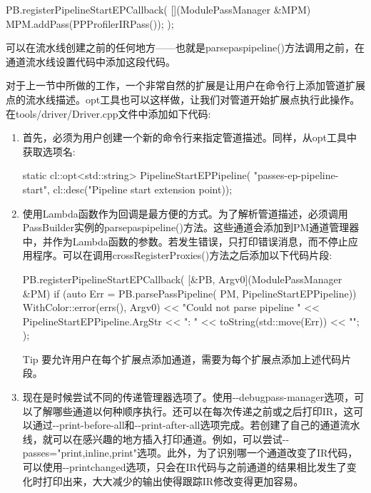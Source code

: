 \begin{cpp}
PB.registerPipelineStartEPCallback(
    [](ModulePassManager &MPM) {
        MPM.addPass(PPProfilerIRPass());
    });
\end{cpp}

可以在流水线创建之前的任何地方——也就是parsepaspipeline()方法调用之前，在通道流水线设置代码中添加这段代码。

对于上一节中所做的工作，一个非常自然的扩展是让用户在命令行上添加管道扩展点的流水线描述。opt工具也可以这样做，让我们对管道开始扩展点执行此操作。在tools/driver/Driver.cpp文件中添加如下代码:

\begin{enumerate}
\item
首先，必须为用户创建一个新的命令行来指定管道描述。同样，从opt工具中获取选项名:

\begin{cpp}
static cl::opt<std::string> PipelineStartEPPipeline(
    "passes-ep-pipeline-start",
    cl::desc("Pipeline start extension point));
\end{cpp}

\item
使用Lambda函数作为回调是最方便的方式。为了解析管道描述，必须调用PassBuilder实例的parsepaspipeline()方法。这些通道会添加到PM通道管理器中，并作为Lambda函数的参数。若发生错误，只打印错误消息，而不停止应用程序。可以在调用crossRegisterProxies()方法之后添加以下代码片段:

\begin{cpp}
PB.registerPipelineStartEPCallback(
[&PB, Argv0](ModulePassManager &PM) {
    if (auto Err = PB.parsePassPipeline(
            PM, PipelineStartEPPipeline)) {
        WithColor::error(errs(), Argv0)
            << "Could not parse pipeline "
            << PipelineStartEPPipeline.ArgStr << ": "
            << toString(std::move(Err)) << "\n";
    }
});
\end{cpp}

\begin{myTip}{Tip}
要允许用户在每个扩展点添加通道，需要为每个扩展点添加上述代码片段。
\end{myTip}

\item
现在是时候尝试不同的传递管理器选项了。使用-{}-debugpass-manager选项，可以了解哪些通道以何种顺序执行。还可以在每次传递之前或之后打印IR，这可以通过-{}-print-before-all和-{}-print-after-all选项完成。若创建了自己的通道流水线，就可以在感兴趣的地方插入打印通道。例如，可以尝试-{}-passes="print,inline,print"选项。此外，为了识别哪一个通道改变了IR代码，可以使用-{}-printchanged选项，只会在IR代码与之前通道的结果相比发生了变化时打印出来，大大减少的输出使得跟踪IR修改变得更加容易。


\end{enumerate}
